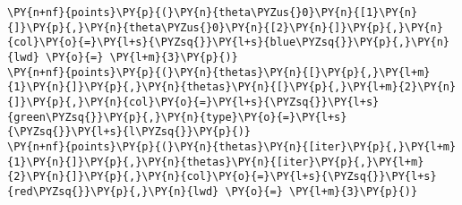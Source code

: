 \begin{tcolorbox}[breakable, size=fbox, boxrule=1pt, pad at break*=1mm,colback=cellbackground, colframe=cellborder]
\begin{Verbatim}[commandchars=\\\{\}]
\PY{n+nf}{points}\PY{p}{(}\PY{n}{theta\PYZus{}0}\PY{n}{[1}\PY{n}{]}\PY{p}{,}\PY{n}{theta\PYZus{}0}\PY{n}{[2}\PY{n}{]}\PY{p}{,}\PY{n}{col}\PY{o}{=}\PY{l+s}{\PYZsq{}}\PY{l+s}{blue\PYZsq{}}\PY{p}{,}\PY{n}{lwd} \PY{o}{=} \PY{l+m}{3}\PY{p}{)}
\PY{n+nf}{points}\PY{p}{(}\PY{n}{thetas}\PY{n}{[}\PY{p}{,}\PY{l+m}{1}\PY{n}{]}\PY{p}{,}\PY{n}{thetas}\PY{n}{[}\PY{p}{,}\PY{l+m}{2}\PY{n}{]}\PY{p}{,}\PY{n}{col}\PY{o}{=}\PY{l+s}{\PYZsq{}}\PY{l+s}{green\PYZsq{}}\PY{p}{,}\PY{n}{type}\PY{o}{=}\PY{l+s}{\PYZsq{}}\PY{l+s}{l\PYZsq{}}\PY{p}{)}
\PY{n+nf}{points}\PY{p}{(}\PY{n}{thetas}\PY{n}{[iter}\PY{p}{,}\PY{l+m}{1}\PY{n}{]}\PY{p}{,}\PY{n}{thetas}\PY{n}{[iter}\PY{p}{,}\PY{l+m}{2}\PY{n}{]}\PY{p}{,}\PY{n}{col}\PY{o}{=}\PY{l+s}{\PYZsq{}}\PY{l+s}{red\PYZsq{}}\PY{p}{,}\PY{n}{lwd} \PY{o}{=} \PY{l+m}{3}\PY{p}{)}
\end{Verbatim}
\end{tcolorbox}
